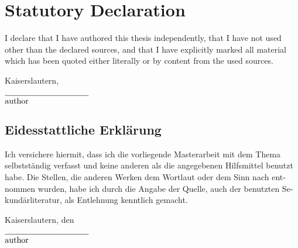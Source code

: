 \section*{Statutory Declaration}
I declare that I have authored this thesis independently, that I have not used other than the declared sources, and that I have explicitly marked all material which has been quoted either literally or by content from the used sources.

\vspace{2\baselineskip}

\noindent Kaiserslautern, \@date
\begin{flushright}
$\overline{\mbox{\@author}\raisebox{3mm}~~~~~~~~~~~~~~~~~~~~~~}$
\end{flushright}

\vspace{2\baselineskip}

\begin{otherlanguage}{ngerman}
\section*{Eidesstattliche Erklärung}
Ich versichere hiermit, dass ich die vorliegende Masterarbeit mit dem Thema \emph{\@title} selbstständig verfasst und keine anderen als die angegebenen Hilfsmittel benutzt habe. Die Stellen, die anderen Werken dem Wortlaut oder dem Sinn nach entnommen wurden, habe ich durch die Angabe der Quelle, auch der benutzten Sekundärliteratur, als Entlehnung kenntlich gemacht.

\vspace{2\baselineskip}

\noindent Kaiserslautern, den \@date
\begin{flushright}
$\overline{\mbox{\@author}\raisebox{3mm}~~~~~~~~~~~~~~~~~~~~~~}$
\end{flushright}
\end{otherlanguage}

